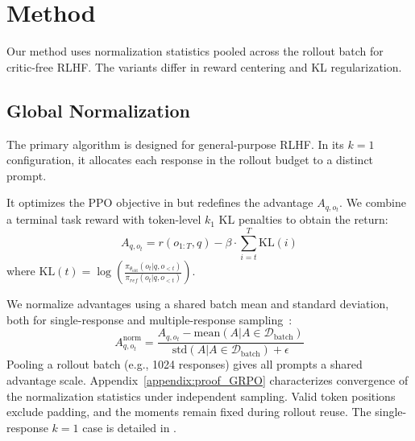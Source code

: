 \section{Method}\label{sec:method}


Our method uses normalization statistics pooled across the rollout batch for critic-free RLHF. The variants differ in reward centering and KL regularization.

\subsection{Global Normalization}

The primary \ours algorithm is designed for general-purpose RLHF. In its $k=1$ configuration, it allocates each response in the rollout budget to a distinct prompt.

It optimizes the PPO objective in  but redefines the advantage $A_{q,o_t}$. We combine a terminal task reward with token-level $k_1$ KL penalties to obtain the return:
\begin{equation}\label{eq:adv}
A_{q,o_t} = r(o_{1:T},q) - \beta \cdot \sum_{i=t}^{T} \mathrm{KL}(i)
\end{equation}
where $\text{KL}(t) = \log\left(\frac{\pi_{\theta_{\text{old}}}(o_t | q, o_{<t})}{\pi_{ref}(o_t | q, o_{<t})}\right)$.

We normalize advantages using a shared batch mean and standard deviation, both for single-response and multiple-response sampling~\citep{andrychowicz2020matters}:
\begin{equation}\label{eq:batch_norm}
A_{q,o_t}^{\text{norm}} = \frac{A_{q,o_t} - \text{mean}\left(A|A \in \mathcal{D}_{\text{batch}}\right)}{\text{std}\left(A|A \in \mathcal{D}_{\text{batch}}\right) + \epsilon}
\end{equation}
Pooling a rollout batch (e.g., 1024 responses) gives all prompts a shared advantage scale. Appendix~\ref{appendix:proof_GRPO} characterizes convergence of the normalization statistics under independent sampling. Valid token positions exclude padding, and the moments remain fixed during rollout reuse.
The single-response $k=1$ case is detailed in .



